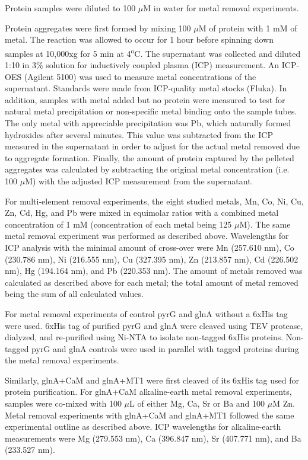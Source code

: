 \documentclass[../main/main]{subfiles}
\begin{document}
Protein samples were diluted to 100 $\mu$M in water for metal removal experiments.

Protein aggregates were first formed by mixing 100 $\mu$M of protein with 1 mM of metal. The reaction was allowed to occur for 1 hour before spinning down samples at 10,000xg for 5 min at 4\textsuperscript{o}C. The supernatant was collected and diluted 1:10 in 3\%  solution for inductively coupled plasma (ICP) measurement. An ICP-OES (Agilent 5100) was used to measure metal concentrations of the supernatant. Standards were made from ICP-quality metal stocks (Fluka). In addition, samples with metal added but no protein were measured to test for natural metal precipitation or non-specific metal binding onto the sample tubes. The only metal with appreciable precipitation was Pb, which naturally formed hydroxides after several minutes. This value was subtracted from the ICP measured in the supernatant in order to adjust for the actual metal removed due to aggregate formation. Finally, the amount of protein captured by the pelleted aggregates was calculated by subtracting the original metal concentration (i.e. 100 $\mu$M) with the adjusted ICP measurement from the supernatant.

For multi-element removal experiments, the eight studied metals, Mn, Co, Ni, Cu, Zn, Cd, Hg, and Pb were mixed in equimolar ratios with a combined metal concentration of 1 mM (concentration of each metal being 125 $\mu$M). The same metal removal experiment was performed as described above. Wavelengths for ICP analysis with the minimal amount of cross-over were Mn (257.610 nm), Co (230.786 nm), Ni (216.555 nm), Cu (327.395 nm), Zn (213.857 nm), Cd (226.502 nm), Hg (194.164 nm), and Pb (220.353 nm). The amount of metals removed was calculated as described above for each metal; the total amount of metal removed being the sum of all calculated values.

For metal removal experiments of control pyrG and glnA without a 6xHis tag were used. 6xHis tag of purified pyrG and glnA were cleaved using TEV protease, dialyzed, and re-purified using Ni-NTA to isolate non-tagged 6xHis proteins. Non-tagged pyrG and glnA controls were used in parallel with tagged proteins during the metal removal experiments.

Similarly, glnA+CaM and glnA+MT1 were first cleaved of its 6xHis tag used for protein purification. For glnA+CaM alkaline-earth metal removal experiments, samples were co-mixed with 100 $\mu$L of either Mg, Ca, Sr or Ba and 100 $\mu$M Zn. Metal removal experiments with glnA+CaM  and glnA+MT1 followed the same experimental outline as described above. ICP wavelengths for alkaline-earth measurements were Mg (279.553 nm), Ca (396.847 nm), Sr (407.771 nm), and Ba (233.527 nm).
\end{document}
